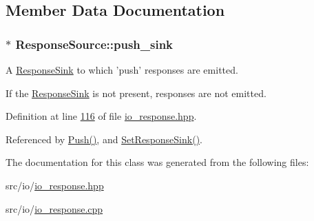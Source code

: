 \subsection{Member Data Documentation}
\hypertarget{classResponseSource_a8a3ce306db2d1a0a9b9c563e5e8c4b31}{
\subsubsection[{push\+\_\+sink}]{$\ast$ Response\+Source\+::push\+\_\+sink\hspace{0.3cm}{\ttfamily [private]}}}\label{classResponseSource_a8a3ce306db2d1a0a9b9c563e5e8c4b31}


A \hyperlink{classResponseSink}{Response\+Sink} to which 'push' responses are emitted. 

If the \hyperlink{classResponseSink}{Response\+Sink} is not present, responses are not emitted. 

Definition at line \hyperlink{io__response_8hpp_source_l00116}{116} of file \hyperlink{io__response_8hpp_source}{io\+\_\+response.\+hpp}.



Referenced by \hyperlink{io__response_8cpp_source_l00047}{Push()}, and \hyperlink{io__response_8cpp_source_l00042}{Set\+Response\+Sink()}.



The documentation for this class was generated from the following files\+:\begin{DoxyCompactItemize}
\item 
src/io/\hyperlink{io__response_8hpp}{io\+\_\+response.\+hpp}\item 
src/io/\hyperlink{io__response_8cpp}{io\+\_\+response.\+cpp}\end{DoxyCompactItemize}
